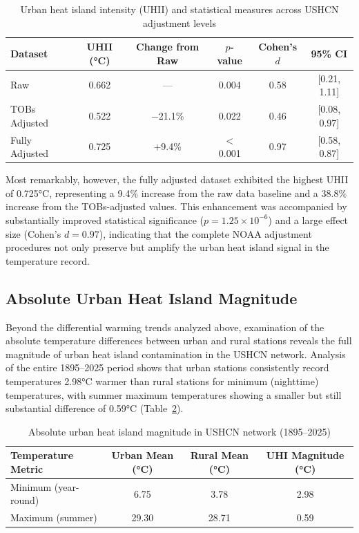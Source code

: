 \documentclass[11pt, a4paper]{article}
\begin{document}
\begin{table}[htbp]
\centering
\caption{Urban heat island intensity (UHII) and statistical measures across USHCN adjustment levels}
\label{tab:uhii_results}
\begin{tabular}{lccccc}
\hline
Dataset & UHII (°C) & Change from Raw & $p$-value & Cohen's $d$ & 95\% CI \\
\hline
Raw & 0.662 & --- & 0.004 & 0.58 & [0.21, 1.11] \\
TOBs Adjusted & 0.522 & $-$21.1\% & 0.022 & 0.46 & [0.08, 0.97] \\
Fully Adjusted & 0.725 & $+$9.4\% & $<$0.001 & 0.97 & [0.58, 0.87] \\
\hline
\end{tabular}
\end{table}

Most remarkably, however, the fully adjusted dataset exhibited the highest UHII of 0.725°C, representing a 9.4\% increase from the raw data baseline and a 38.8\% increase from the TOBs-adjusted values. This enhancement was accompanied by substantially improved statistical significance ($p = 1.25 \times 10^{-6}$) and a large effect size (Cohen's $d = 0.97$), indicating that the complete NOAA adjustment procedures not only preserve but amplify the urban heat island signal in the temperature record.

\subsection{Absolute Urban Heat Island Magnitude}

Beyond the differential warming trends analyzed above, examination of the absolute temperature differences between urban and rural stations reveals the full magnitude of urban heat island contamination in the USHCN network. Analysis of the entire 1895--2025 period shows that urban stations consistently record temperatures 2.98°C warmer than rural stations for minimum (nighttime) temperatures, with summer maximum temperatures showing a smaller but still substantial difference of 0.59°C (Table~\ref{tab:absolute_uhii}).

\begin{table}[htbp]
\centering
\caption{Absolute urban heat island magnitude in USHCN network (1895--2025)}
\label{tab:absolute_uhii}
\begin{tabular}{lccc}
\hline
Temperature Metric & Urban Mean (°C) & Rural Mean (°C) & UHI Magnitude (°C) \\
\hline
Minimum (year-round) & 6.75 & 3.78 & 2.98 \\
Maximum (summer) & 29.30 & 28.71 & 0.59 \\
\hline
\end{tabular}
\end{table}
\end{document}
